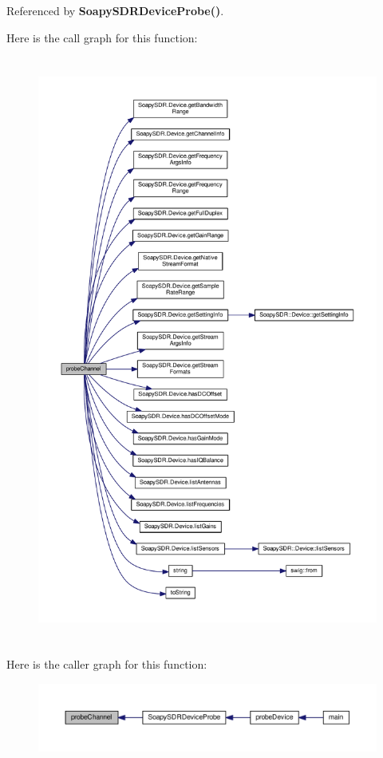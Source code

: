 Referenced by {\bf Soapy\+S\+D\+R\+Device\+Probe()}.



Here is the call graph for this function\+:
\nopagebreak
\begin{figure}[H]
\begin{center}
\leavevmode
\includegraphics[height=550pt]{db/da3/SoapySDRProbe_8cpp_a49355e1a3c7e9cca635cd9aba555d5cf_cgraph}
\end{center}
\end{figure}




Here is the caller graph for this function\+:
\nopagebreak
\begin{figure}[H]
\begin{center}
\leavevmode
\includegraphics[width=350pt]{db/da3/SoapySDRProbe_8cpp_a49355e1a3c7e9cca635cd9aba555d5cf_icgraph}
\end{center}
\end{figure}


